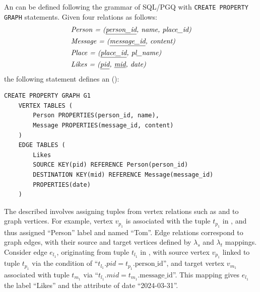 \begin{example}
    \label{ex:rgmapping}
    An \rgmapping can be defined following the grammar of SQL/PGQ with \lstinline{CREATE PROPERTY GRAPH} statements.
    Given four relations as follows:
    \begin{equation*}
        \begin{split}
            & \textit{Person = (\underline{person\_id}, name, place\_id)} \\
            & \textit{Message = (\underline{message\_id}, content)} \\
            & \textit{Place = (\underline{place\_id}, pl\_name)} \\
            & \textit{Likes = (\underline{pid}, \underline{mid}, date)}
        \end{split}
    \end{equation*}
    the following statement defines an \rgmapping ():
    \begin{lstlisting}
CREATE PROPERTY GRAPH G1
    VERTEX TABLES (
        Person PROPERTIES(person_id, name),
        Message PROPERTIES(message_id, content)
    )
    EDGE TABLES (
        Likes
        SOURCE KEY(pid) REFERENCE Person(person_id)
        DESTINATION KEY(mid) REFERENCE Message(message_id)
        PROPERTIES(date)
    )
    \end{lstlisting}
    The described \rgmapping involves assigning tuples from vertex relations such as  and  to graph vertices. For example, vertex $v_{p_1}$ is associated with the tuple $t_{p_1}$ in , and thus assigned ``Person'' label and named ``Tom''. Edge relations  correspond to graph edges, with their source and target vertices defined by $\lambda_s$ and $\lambda_t$ mappings. Consider edge $e_{l_1}$, originating from tuple $t_{l_1}$ in , with source vertex $v_{p_1}$ linked to tuple $t_{p_1}$ via the condition of
    ``$t_{l_1}.pid = t_{p_1}.\text{person\_id}$'', and target vertex $v_{m_1}$ associated with tuple $t_{m_1}$
    via ``$t_{l_1}.mid = t_{m_1}.\text{message\_id}$''. This mapping gives $e_{l_1}$ the label ``Likes'' and the attribute of date ``2024-03-31''.
\end{example}


